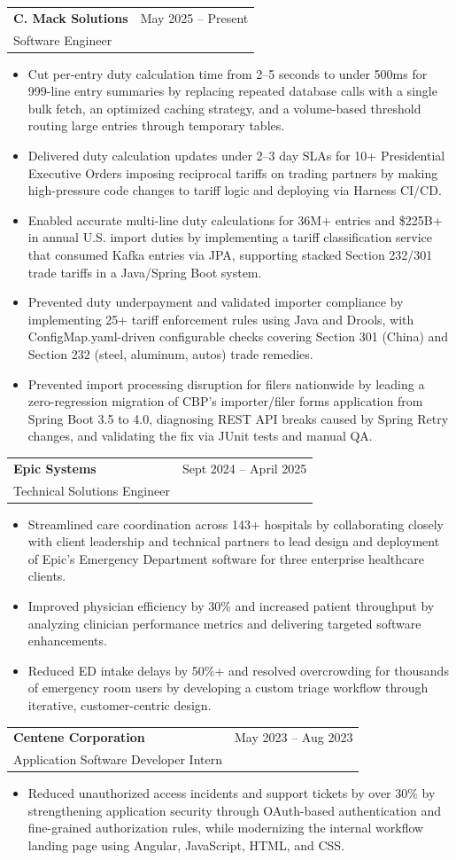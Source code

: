 \documentclass[letterpaper,11pt]{article}
\makeatletter
\newcommand{\resumeItem}[1]{
  \item\small{
    {#1 \vspace{-2pt}}
  }
}
\newcommand{\resumeSubheading}[4]{
  \vspace{-1pt}\item
    \begin{tabular*}{0.97\textwidth}[t]{l@{\extracolsep{\fill}}r}
      \textbf{#1} & #2 \\
      #3 & \textit{\small #4} \\
    \end{tabular*}\vspace{-5pt}
}
\newcommand{\resumeItemListStart}{\begin{itemize}[itemsep=-1pt]}
\newcommand{\resumeItemListEnd}{\end{itemize}\vspace{-4pt}}
\makeatother
\begin{document}
    \resumeSubheading
      {C. Mack Solutions}{May 2025 -- Present}
      {Software Engineer}{}
      \resumeItemListStart
       \resumeItem{Cut per-entry duty calculation time from 2--5 seconds to under 500ms for 999-line entry summaries by replacing repeated database calls with a single bulk fetch, an optimized caching strategy, and a volume-based threshold routing large entries through temporary tables.}
\resumeItem{Delivered duty calculation updates under 2--3 day SLAs for 10+ Presidential Executive Orders imposing reciprocal tariffs on trading partners by making high-pressure code changes to tariff logic and deploying via Harness CI/CD.}
\resumeItem{Enabled accurate multi-line duty calculations for 36M+ entries and \$225B+ in annual U.S. import duties by implementing a tariff classification service that consumed Kafka entries via JPA, supporting stacked Section 232/301 trade tariffs in a Java/Spring Boot system.}\resumeItem{Prevented duty underpayment and validated importer compliance by implementing 25+ tariff enforcement rules using Java and Drools, with ConfigMap.yaml-driven configurable checks covering Section 301 (China) and Section 232 (steel, aluminum, autos) trade remedies.}
\resumeItem{Prevented import processing disruption for filers nationwide by leading a zero-regression migration of CBP's importer/filer forms application from Spring Boot 3.5 to 4.0, diagnosing REST API breaks caused by Spring Retry changes, and validating the fix via JUnit tests and manual QA.}  \resumeItemListEnd

    \resumeSubheading
      {Epic Systems}{Sept 2024 -- April 2025}
      {Technical Solutions Engineer}{}
      \resumeItemListStart
        \resumeItem{Streamlined care coordination across 143+ hospitals by collaborating closely with client leadership and technical partners to lead design and deployment of Epic's Emergency Department software for three enterprise healthcare clients.}
        \resumeItem{Improved physician efficiency by 30\% and increased patient throughput by analyzing clinician performance metrics and delivering targeted software enhancements.}
        \resumeItem{Reduced ED intake delays by 50\%+ and resolved overcrowding for thousands of emergency room users by developing a custom triage workflow through iterative, customer-centric design.}
      \resumeItemListEnd

    \resumeSubheading
      {Centene Corporation}{May 2023 -- Aug 2023}
      {Application Software Developer Intern}{}
      \resumeItemListStart
        \resumeItem{Reduced unauthorized access incidents and support tickets by over 30\% by strengthening application security through OAuth-based authentication and fine-grained authorization rules, while modernizing the internal workflow landing page using Angular, JavaScript, HTML, and CSS.}
      \resumeItemListEnd
\end{document}
